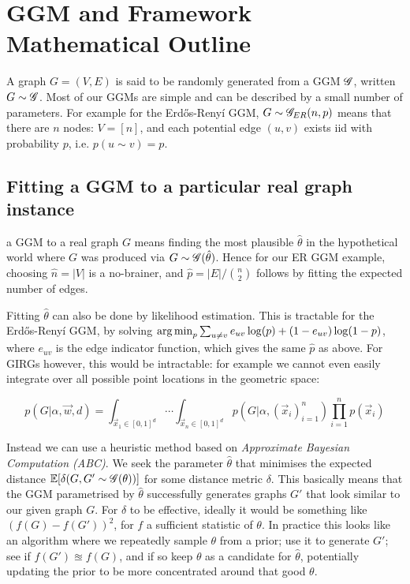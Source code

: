 

\section{GGM and Framework Mathematical Outline}
A graph $G = (V,E)$ is said to be randomly generated from a GGM $\mathscr{G}$, written $G \sim \mathscr{G}$. Most of our GGMs are simple and can be described by a small number of parameters. For example for the Erd\H{o}s-Reny{\'i} GGM, $G \sim \mathscr{G}_{ER}(n, p)$ means that there are $n$ nodes: $V=[n]$, and each potential edge $(u,v)$ exists iid with probability $p$, i.e. $p(u \sim v) = p$.

\subsection{Fitting a GGM to a particular real graph instance}
\label{sec:fitting_GGM}
 a GGM to a real graph $G$ means finding the most plausible $\hat{\theta}$ in the hypothetical world where $G$ was produced via $G \sim \mathscr{G}(\hat{\theta})$. Hence for our ER GGM example, choosing $\hat{n} = |V|$ is a no-brainer, and $\hat{p} = |E| / \binom{n}{2}$ follows by fitting the expected number of edges.

Fitting $\hat{\theta}$ can also be done by likelihood estimation. This is tractable for the Erd\H{o}s-Reny{\'i} GGM, by solving $\operatorname*{arg\,min}_p \sum_{u \neq v} e_{uv} \log(p) + (1 - e_{uv}) \log( 1 - p)$, where $e_{uv}$ is the edge indicator function, which gives the same $\hat{p}$ as above. For GIRGs however, this would be intractable: for example we cannot even easily integrate over all possible point locations in the geometric space:

\begin{equation}
    p(G | \alpha, \vec{w}, d) = \int_{\vec{x}_1 \in [0,1]^d} \cdots \int_{\vec{x}_n \in [0,1]^d} p(G | \alpha, (\vec{x}_i)_{i=1}^n) \prod_{i=1}^n p(\vec{x}_i)
\end{equation}

Instead we can use a heuristic method based on \textit{Approximate Bayesian Computation (ABC)}. We seek the parameter $\hat{\theta}$ that minimises the expected distance $ \mathbb{E}[\delta(G, G' \sim \mathscr{G}(\theta))]$ for some distance metric $\delta$. This basically means that the GGM parametrised by $\hat{\theta}$ successfully generates graphs $G'$ that look similar to our given graph $G$.
For $\delta$ to be effective, ideally it would be something like $(f(G) - f(G'))^2$, for $f$ a sufficient statistic of $\theta$. In practice this looks like an algorithm where we repeatedly sample $\theta$ from a prior; use it to generate $G'$; see if $f(G') \approxeq f(G)$, and if so keep $\theta$ as a candidate for $\hat{\theta}$, potentially updating the prior to be more concentrated around that good $\theta$.

